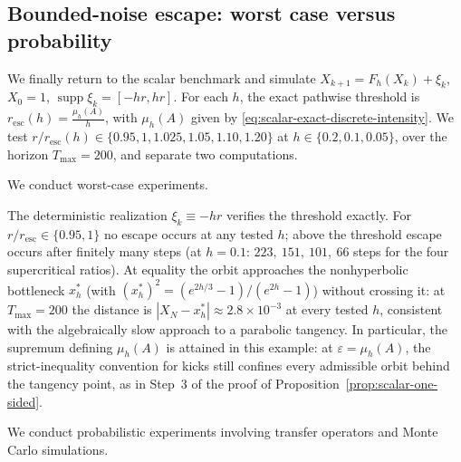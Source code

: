 \documentclass[pdflatex,sn-mathphys-num]{sn-jnl}
\numberwithin{equation}{section}
\theoremstyle{thmstyleone}%
\theoremstyle{definition}
\theoremstyle{remark}
\begin{document}
\subsection{Bounded-noise escape: worst case versus probability}
\label{subsec:bounded-noise-experiment}

We finally return to the scalar benchmark and simulate
    $X_{k+1}=F_h(X_k)+\xi_k$,
    $X_0=1$,
    $\operatorname{supp}\xi_k=[-hr,hr]$.
For each \(h\), the exact pathwise threshold is
    $r_{\mathrm{esc}}(h)
    =
    \frac{\mu_h(A)}h$,
with \(\mu_h(A)\) given by \eqref{eq:scalar-exact-discrete-intensity}.  We test \(r/r_{\mathrm{esc}}(h)\in\{0.95,1,1.025,1.05,1.10,1.20\}\) at \(h\in\{0.2,0.1,0.05\}\), over the horizon \(T_{\max}=200\), and
separate two computations.

We conduct worst-case experiments.

The deterministic realization \(\xi_k\equiv-hr\) verifies the threshold exactly.  For \(r/r_{\mathrm{esc}}\in\{0.95,1\}\) no escape occurs at any tested \(h\); above the threshold escape occurs after finitely many steps (at \(h=0.1\): \(223,\ 151,\ 101,\ 66\) steps for the four supercritical ratios).  At equality the orbit approaches the nonhyperbolic bottleneck \(x_h^\ast\) (with \((x_h^\ast)^2=(e^{2h/3}-1)/(e^{2h}-1)\)) without crossing it: at \(T_{\max}=200\) the distance is \(|X_N-x_h^\ast|\approx2.8\times10^{-3}\) at every tested \(h\), consistent with the algebraically slow approach to a parabolic tangency. In particular, the supremum defining \(\mu_h(A)\) is attained in this example: at \(\varepsilon=\mu_h(A)\), the strict-inequality convention for kicks still confines every admissible
orbit behind the tangency point, as in Step~3 of the proof of Proposition~\ref{prop:scalar-one-sided}.

We conduct probabilistic experiments involving transfer operators and Monte Carlo simulations.
\end{document}
